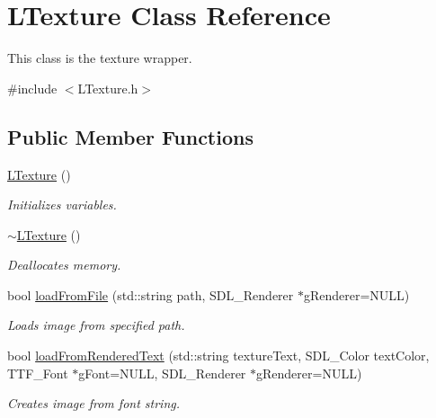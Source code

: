 \hypertarget{class_l_texture}{}\section{L\+Texture Class Reference}
\label{class_l_texture}


This class is the texture wrapper.  




{\ttfamily \#include $<$L\+Texture.\+h$>$}

\subsection*{Public Member Functions}
\begin{DoxyCompactItemize}
\item 
\mbox{\label{class_l_texture_a12fbc9278f97388cce5ce18863b462ff}} 
\mbox{\hyperlink{class_l_texture_a12fbc9278f97388cce5ce18863b462ff}{L\+Texture}} ()
\begin{DoxyCompactList}\small\item\em Initializes variables. \end{DoxyCompactList}\item 
\mbox{\label{class_l_texture_a49cfe57c36e58ad99c1ea73fc274b77b}} 
\mbox{\hyperlink{class_l_texture_a49cfe57c36e58ad99c1ea73fc274b77b}{$\sim$\+L\+Texture}} ()
\begin{DoxyCompactList}\small\item\em Deallocates memory. \end{DoxyCompactList}\item 
bool \mbox{\hyperlink{class_l_texture_a32f547476861cdc9ebfe86344b49c644}{load\+From\+File}} (std\+::string path, S\+D\+L\+\_\+\+Renderer $\ast$g\+Renderer=N\+U\+LL)
\begin{DoxyCompactList}\small\item\em Loads image from specified path. \end{DoxyCompactList}\item 
bool \mbox{\hyperlink{class_l_texture_a96829c5b17760248c963fd1c9fbd10bb}{load\+From\+Rendered\+Text}} (std\+::string texture\+Text, S\+D\+L\+\_\+\+Color text\+Color, T\+T\+F\+\_\+\+Font $\ast$g\+Font=N\+U\+LL, S\+D\+L\+\_\+\+Renderer $\ast$g\+Renderer=N\+U\+LL)
\begin{DoxyCompactList}\small\item\em Creates image from font string. \end{DoxyCompactList}\item 

\end{DoxyCompactItemize}
